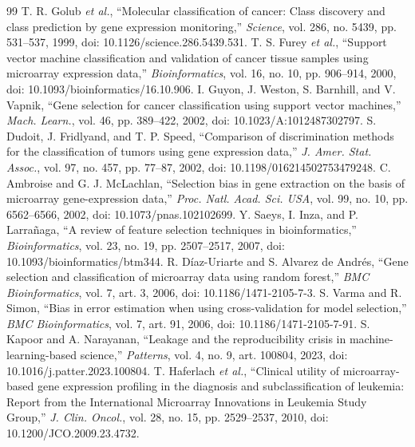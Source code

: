 \documentclass[conference]{IEEEtran}
\begin{document}
\begin{thebibliography}{99}
 T. R. Golub \textit{et al.}, ``Molecular classification of cancer: Class discovery and class prediction by gene expression monitoring,'' \textit{Science}, vol. 286, no. 5439, pp. 531--537, 1999, doi: 10.1126/science.286.5439.531.
 T. S. Furey \textit{et al.}, ``Support vector machine classification and validation of cancer tissue samples using microarray expression data,'' \textit{Bioinformatics}, vol. 16, no. 10, pp. 906--914, 2000, doi: 10.1093/bioinformatics/16.10.906.
 I. Guyon, J. Weston, S. Barnhill, and V. Vapnik, ``Gene selection for cancer classification using support vector machines,'' \textit{Mach. Learn.}, vol. 46, pp. 389--422, 2002, doi: 10.1023/A:1012487302797.
 S. Dudoit, J. Fridlyand, and T. P. Speed, ``Comparison of discrimination methods for the classification of tumors using gene expression data,'' \textit{J. Amer. Stat. Assoc.}, vol. 97, no. 457, pp. 77--87, 2002, doi: 10.1198/016214502753479248.
 C. Ambroise and G. J. McLachlan, ``Selection bias in gene extraction on the basis of microarray gene-expression data,'' \textit{Proc. Natl. Acad. Sci. USA}, vol. 99, no. 10, pp. 6562--6566, 2002, doi: 10.1073/pnas.102102699.
 Y. Saeys, I. Inza, and P. Larrañaga, ``A review of feature selection techniques in bioinformatics,'' \textit{Bioinformatics}, vol. 23, no. 19, pp. 2507--2517, 2007, doi: 10.1093/bioinformatics/btm344.
 R. Díaz-Uriarte and S. Alvarez de Andrés, ``Gene selection and classification of microarray data using random forest,'' \textit{BMC Bioinformatics}, vol. 7, art. 3, 2006, doi: 10.1186/1471-2105-7-3.
 S. Varma and R. Simon, ``Bias in error estimation when using cross-validation for model selection,'' \textit{BMC Bioinformatics}, vol. 7, art. 91, 2006, doi: 10.1186/1471-2105-7-91.
 S. Kapoor and A. Narayanan, ``Leakage and the reproducibility crisis in machine-learning-based science,'' \textit{Patterns}, vol. 4, no. 9, art. 100804, 2023, doi: 10.1016/j.patter.2023.100804.
 T. Haferlach \textit{et al.}, ``Clinical utility of microarray-based gene expression profiling in the diagnosis and subclassification of leukemia: Report from the International Microarray Innovations in Leukemia Study Group,'' \textit{J. Clin. Oncol.}, vol. 28, no. 15, pp. 2529--2537, 2010, doi: 10.1200/JCO.2009.23.4732.

\end{thebibliography}
\end{document}
